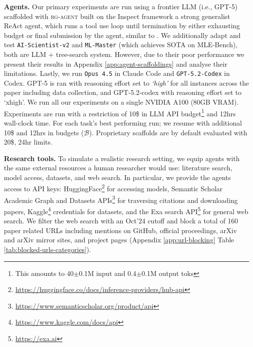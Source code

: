 \documentclass[11pt]{article}
\let\oldtexttt\texttt
\renewcommand{\texttt}[1]{{\fontseries{m}\selectfont\oldtexttt{#1}}}
\let\cite\citep
\newcommand{\kw}[1]{{\textsc{\MakeLowercase{#1}}}}
\theoremstyle{plain}
\theoremstyle{definition}
\theoremstyle{remark}
\begin{document}
\textbf{Agents.}  Our primary experiments are run using a frontier LLM (i.e., GPT-5) scaffolded with \kw{rg-agent} built on the Inspect framework 
\cite{UK_AI_Security_Institute_Inspect_AI_Framework_2024} 
a strong generalist ReAct \cite{yao2023react} agent, which runs a tool use loop until termination by either exhausting budget or final submission by the agent, similar to \cite{starace2025paperbench}. 
We additionally adapt and test 
\texttt{AI-Scientist-v2} \cite{yamada2025aiscientistv2workshoplevelautomated} and \texttt{ML-Master} \cite{liu2025mlmasteraiforaiintegrationexploration} (which achieves SOTA on MLE-Bench), both are LLM + tree-search system. However, due to their poor performance we present their results in Appendix \ref{app:agent-scaffoldings} and analyse their limitations. 
Lastly, we run \texttt{Opus 4.5} in Claude Code and \texttt{GPT-5.2-Codex} in Codex. GPT-5 is ran with reasoning effort set to \emph{`high'} for all instances across the paper including data collection, and GPT-5.2-codex with reasoning effort set to `xhigh'.
We run all our experiments on 
a single NVIDIA A100 (80GB VRAM). Experiments are run with a restriction of 10\$ in LLM API budget\footnote{This amounts to 40$\pm$0.1M input and 0.4$\pm$0.1M output toks}
and 12hrs wall-clock time. For each task's best performing run; we resume with additional 10\$ and 12hrs in budgets ($\mathcal{B}$). 
Proprietary scaffolds are by default evaluated with 20\$, 24hr limits. 


\textbf{Research tools.} 
To simulate a realistic research setting, we equip agents with the same external resources a human researcher would use: literature
  search, model access, datasets, and web search.
In particular, we provide the agents access to API keys: HuggingFace\footnote{\href{https://huggingface.co/docs/inference-providers/hub-api}{https://huggingface.co/docs/inference-providers/hub-api}} for accessing models, Semantic Scholar Academic Graph and Datasets APIs\footnote{\href{https://www.semanticscholar.org/product/api}{https://www.semanticscholar.org/product/api}} for traversing citations and downloading papers, Kaggle\footnote{\href{https://www.kaggle.com/docs/api}{https://www.kaggle.com/docs/api}} credentials for datasets, and the Exa search API\footnote{\href{https://exa.ai}{https://exa.ai}}
for general web search. We filter the web search with an Oct'24 cutoff and block a total of 160 paper related URLs including mentions on GitHub, official proceedings, arXiv and arXiv mirror sites, and project pages (Appendix \ref{app:url-blocking} Table \ref{tab:blocked-urls-categories}). 
\end{document}
